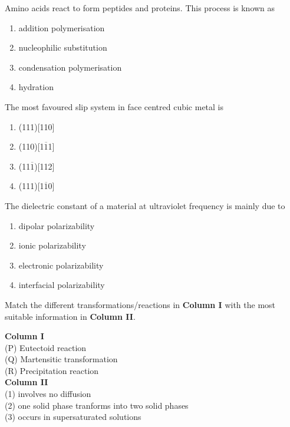 	\item Amino acids react to form peptides and proteins. This process is known as
		\begin{enumerate}
			\item addition polymerisation
			\item nucleophilic substitution
			\item condensation polymerisation
			\item hydration
		\end{enumerate}
	\item The most favoured slip system in face centred cubic metal is
		\begin{enumerate}                                                                   
			\item (111)[110]                                               
			\item (110)[1$\overline{1}$1]
			\item (11$\overline{1}$)[112]
			\item (111)[1$\overline{1}$0]
                \end{enumerate}
	\item The dielectric constant of a material at ultraviolet frequency is mainly due to
		\begin{enumerate}                                                                   
                        \item dipolar polarizability                                         
                        \item ionic polarizability
                        \item electronic polarizability
                        \item interfacial polarizability
                \end{enumerate}
	\item Match the different transformations/reactions in \textbf{Column I} with the most suitable information in \textbf{Column II}.
		\begin{multicols}{2}
			\textbf{Column I} \\
			(P) Eutectoid reaction \\
			(Q) Martensitic transformation \\
			(R) Precipitation reaction
			\columnbreak \\
			\textbf{Column II} \\
			(1) involves no diffusion \\
			(2) one solid phase tranforms into two solid phases \\
			(3) occurs in supersaturated solutions
		\end{multicols}
